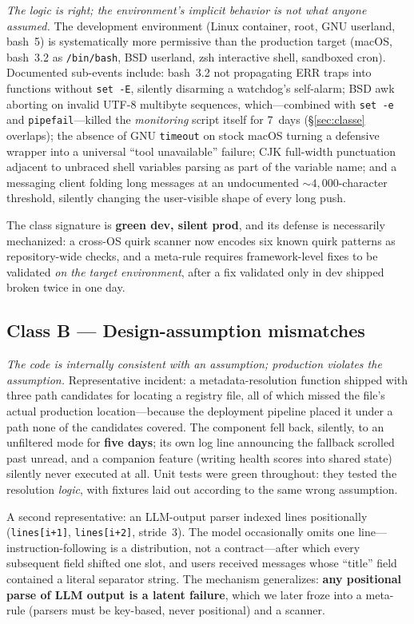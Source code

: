\emph{The logic is right; the environment's implicit behavior is not what
anyone assumed.} The development environment (Linux container, root, GNU
userland, bash~5) is systematically more permissive than the production
target (macOS, bash~3.2 as \texttt{/bin/bash}, BSD userland, zsh
interactive shell, sandboxed cron). Documented sub-events include:
bash~3.2 not propagating ERR traps into functions without
\texttt{set~-E}, silently disarming a watchdog's self-alarm; BSD awk
aborting on invalid UTF-8 multibyte sequences, which---combined with
\texttt{set~-e} and \texttt{pipefail}---killed the \emph{monitoring}
script itself for 7~days (\S\ref{sec:classe} overlaps); the absence of
GNU \texttt{timeout} on stock macOS turning a defensive wrapper into a
universal ``tool unavailable'' failure; CJK full-width punctuation
adjacent to unbraced shell variables parsing as part of the variable
name; and a messaging client folding long messages at an undocumented
${\sim}4{,}000$-character threshold, silently changing the user-visible
shape of every long push.

The class signature is \textbf{green dev, silent prod}, and its defense
is necessarily mechanized: a cross-OS quirk scanner now encodes six known
quirk patterns as repository-wide checks, and a meta-rule requires
framework-level fixes to be validated \emph{on the target environment},
after a fix validated only in dev shipped broken twice in one day.

\subsection{Class B --- Design-assumption mismatches}\label{sec:classb}

\emph{The code is internally consistent with an assumption; production
violates the assumption.} Representative incident: a metadata-resolution
function shipped with three path candidates for locating a registry
file, all of which missed the file's actual production
location---because the deployment pipeline placed it under a path none of
the candidates covered. The component fell back, silently, to an
unfiltered mode for \textbf{five days}; its own log line announcing the
fallback scrolled past unread, and a companion feature (writing health
scores into shared state) silently never executed at all. Unit tests
were green throughout: they tested the resolution \emph{logic}, with
fixtures laid out according to the same wrong assumption.

A second representative: an LLM-output parser indexed lines positionally
(\texttt{lines[i+1]}, \texttt{lines[i+2]}, stride~3). The model
occasionally omits one line---instruction-following is a distribution,
not a contract---after which every subsequent field shifted one slot,
and users received messages whose ``title'' field contained a literal
separator string. The mechanism generalizes: \textbf{any positional
parse of LLM output is a latent  failure}, which we later
froze into a meta-rule (parsers must be key-based, never positional) and
a scanner.

